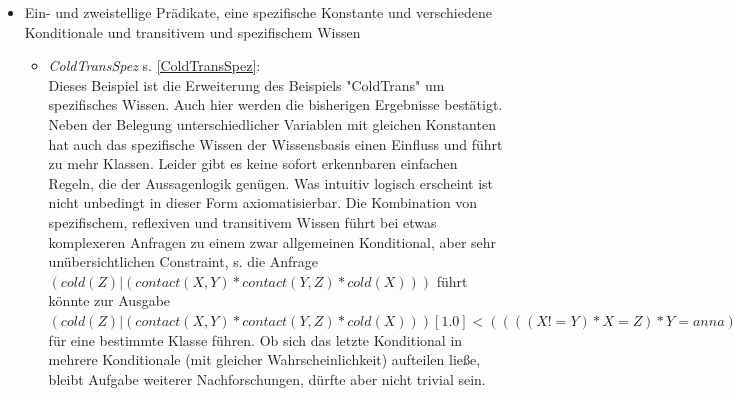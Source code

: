\documentclass[a4paper, 11pt]{book}
\begin{document}
\begin{itemize}
\begin{itemize}
 Man betrachte das unbedingte Konditional $\langle (cold(X) \mid ((contact(X,Y)  \land contact(Y,Z)) \land cold(Z)),  X = Z \rangle$ . Sei cold(Z) (als Teil der Prämisse) wahr. Dann ist cold(X) (also die Konklusion) auch wahr für X = Z, was nicht weiter überraschend ist, aber an dieser Stelle für erwähnenswert gehalten wurde, da es durchaus für den Entwurf eines regelbasierten Algorithmus relevant sein könnte. Das bedingte Konditional sollte damit wie folgt aussehen: $\langle (cold(X) \mid ((contact(X,Y)  \land contact(Y,Z)) \land cold(Z)) [1.00000],  X = Z \rangle$.\\ Im Ergebnis bleibt zu sagen, dass auch Transitivität zu keinen überraschenden Ergebnissen führt. Lediglich die Belegung unterschiedlicher Variablen mit gleichen Konstanten hat einen erheblichen Einfluss. Ebenso die Gestalt bzw. das Wissen der Anfrage.
\end{itemize}


\item{Ein- und zweistellige Prädikate, eine spezifische Konstante und verschiedene Konditionale und transitivem und spezifischem Wissen}
\begin{itemize}
\item \textsl{ColdTransSpez} \label{BColdTransSpez} s. \ref{ColdTransSpez}:\\
Dieses Beispiel ist die Erweiterung des Beispiels "{}ColdTrans"{} um spezifisches Wissen. Auch hier werden die bisherigen Ergebnisse bestätigt. Neben der Belegung unterschiedlicher Variablen mit gleichen Konstanten hat auch das spezifische Wissen der Wissensbasis einen Einfluss und führt zu mehr Klassen. Leider gibt es keine sofort erkennbaren einfachen Regeln, die der Aussagenlogik genügen. Was intuitiv logisch erscheint ist nicht unbedingt in dieser Form axiomatisierbar. Die Kombination von spezifischem, reflexiven und transitivem Wissen führt bei etwas komplexeren Anfragen zu einem zwar allgemeinen Konditional, aber sehr unübersichtlichen Constraint, s. die Anfrage $ (cold(Z)|(contact(X,Y) * contact(Y,Z) * cold(X))) $ führt könnte zur Ausgabe $ (cold(Z)|(contact(X,Y) * contact(Y,Z) * cold(X)))[1.0]<((((X != Y) * X = Z) * Y = anna) + ( X = Y * X = Z)) + (X = Z * Z = anna) * X != Y)) + (( X != anna * Y != anna * Z != anna))> $ für eine bestimmte Klasse führen. Ob sich das letzte Konditional in mehrere Konditionale (mit gleicher Wahrscheinlichkeit) aufteilen ließe, bleibt Aufgabe weiterer Nachforschungen, dürfte aber nicht trivial sein. 
\end{itemize}

\end{itemize}
\end{document}
